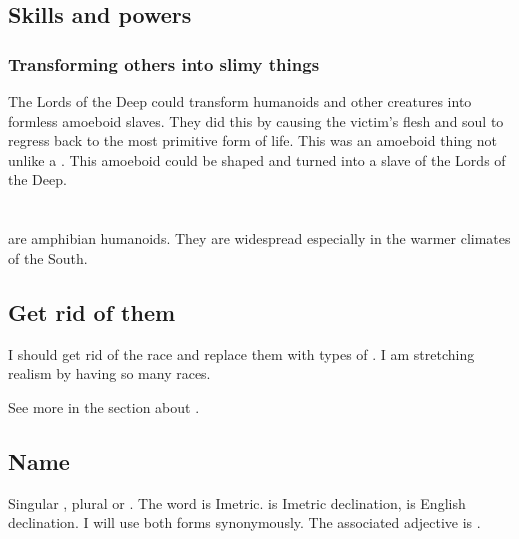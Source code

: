 \subsection{Skills and powers}





\subsubsection{Transforming others into slimy things}
The Lords of the Deep could transform humanoids and other creatures into formless amoeboid slaves.
They did this by causing the victim's flesh and soul to regress back to the most primitive form of life.
This was an amoeboid thing not unlike a \noggyal. 
This amoeboid could be shaped and turned into a slave of the Lords of the Deep.

















\section[Meccaran]{\Meccaran}
\Meccara{} are amphibian humanoids. They are widespread especially in the warmer climates of the South. 









\subsection{Get rid of them}
I should get rid of the \meccaran race and replace them with types of \demiscathae.
I am stretching realism by having so many races. 

See more in the section about . 









\subsection{Name}
Singular \emph{\meccaran{}}, plural \emph{\meccara{}} or \emph{\meccarans{}}. %
The word is Imetric. \emph{\Meccara{}} is Imetric declination, \emph{\meccarans{}} is English declination. I will use both forms synonymously. 
The associated adjective is \emph{\meccaran{}}. 









